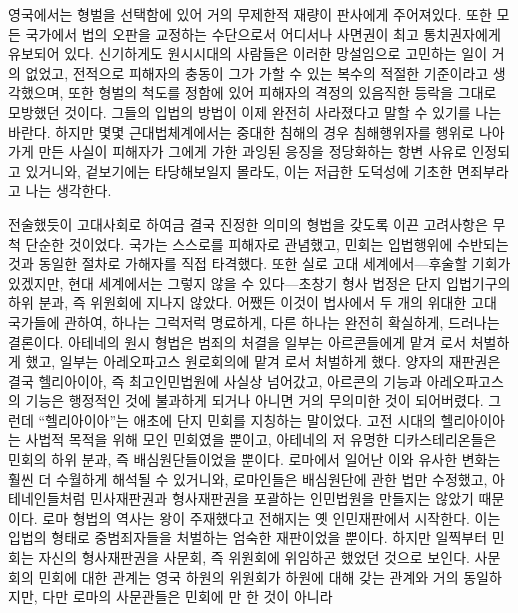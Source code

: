 영국에서는
형벌을 선택함에 있어 거의 무제한적 재량이
판사에게 주어져있다.
또한 모든 국가에서
법의 오판을 교정하는 수단으로서
어디서나 사면권이 최고 통치권자에게 유보되어 있다.
신기하게도
원시시대의 사람들은 이러한 망설임으로 고민하는 일이 거의 없었고,
전적으로
피해자의 충동이 그가 가할 수 있는 복수의 적절한 기준이라고 생각했으며,
또한 형벌의 척도를 정함에 있어
피해자의 격정의 있음직한 등락을 그대로 모방했던 것이다.
그들의 입법의 방법이 이제 완전히 사라졌다고 말할 수 있기를 나는 바란다.
하지만 몇몇 근대법체계에서는
중대한 침해의 경우
침해행위자를 행위로 나아가게 만든 사실이
피해자가 그에게 가한 과잉된 응징을
정당화하는 항변 사유로 인정되고 있거니와,
겉보기에는 타당해보일지 몰라도,
이는
저급한 도덕성에 기초한 면죄부라고 나는 생각한다.

전술했듯이
고대사회로 하여금 결국 진정한 의미의 형법을 갖도록 이끈
고려사항은 무척 단순한 것이었다.
국가는 스스로를 피해자로 관념했고,
민회는 입법행위에 수반되는 것과 동일한 절차로
가해자를 직접 타격했다.
또한 실로 고대 세계에서---후술할 기회가 있겠지만,
현대 세계에서는 그렇지 않을 수 있다---초창기 형사 법정은
단지 입법기구의 하위 분과, 즉 위원회에 지나지 않았다.
어쨌든 이것이
법사에서 두 개의 위대한 고대 국가들에 관하여,
하나는 그럭저럭 명료하게, 다른 하나는 완전히 확실하게,
드러나는 결론이다.
아테네의 원시 형법은 범죄의 처결을
일부는 아르콘들에게 맡겨
로서 처벌하게 했고,
일부는 아레오파고스 원로회의에 맡겨
로서 처벌하게 했다.
양자의 재판권은 결국 헬리아이아, 즉
최고인민법원에 사실상 넘어갔고,
아르콘의 기능과 아레오파고스의 기능은 행정적인 것에 불과하게 되거나
아니면 거의 무의미한 것이 되어버렸다.
그런데 ``헬리아이아''는 애초에 단지 민회를 지칭하는 말이었다.
고전 시대의 헬리아이아는 사법적 목적을 위해
모인 민회였을 뿐이고,
아테네의 저 유명한 디카스테리온들은
민회의 하위 분과, 즉 배심원단들이었을 뿐이다.
로마에서 일어난 이와 유사한 변화는
훨씬 더 수월하게 해석될 수 있거니와,
로마인들은 배심원단에 관한 법만 수정했고,
아테네인들처럼 민사재판권과 형사재판권을 포괄하는 인민법원을
만들지는 않았기 때문이다.
로마 형법의 역사는
왕이 주재했다고 전해지는
옛 인민재판에서 시작한다.
이는 입법의 형태로 중범죄자들을 처벌하는 엄숙한 재판이었을 뿐이다.
하지만
일찍부터
민회는 자신의 형사재판권을
사문회, 즉 위원회에
위임하곤 했었던 것으로 보인다.
사문회의 민회에 대한 관계는
영국 하원의 위원회가 하원에 대해 갖는 관계와 거의 동일하지만,
다만 로마의 사문관들은
민회에 만 한 것이 아니라
